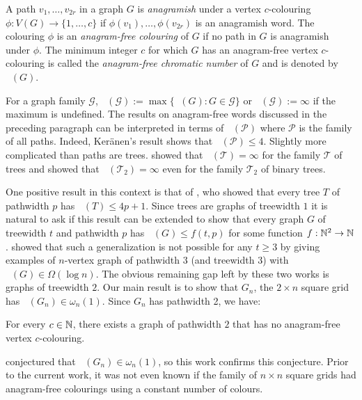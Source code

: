 \documentclass{patmorin}
\DeclareMathOperator{\afcn}{\dot{\chi}_\pi}
\begin{document}
A path $v_1,\ldots,v_{2r}$ in a graph $G$ is \emph{anagramish} under a vertex $c$-colouring $\phi:V(G)\to\{1,\ldots,c\}$ if $\phi(v_1),\ldots,\phi(v_{2r})$ is an anagramish word.  The colouring $\phi$ is an \emph{anagram-free colouring} of $G$ if no path in $G$ is anagramish under $\phi$.  The minimum integer $c$ for which $G$ has an anagram-free vertex $c$-colouring is called the \emph{anagram-free chromatic number} of $G$ and is denoted by $\afcn(G)$.

For a graph family $\mathcal{G}$, $\afcn(\mathcal{G}):=\max\{\afcn(G):G\in\mathcal{G}\}$ or $\afcn(\mathcal{G}):=\infty$ if the maximum is undefined. The results on anagram-free words discussed in the preceding paragraph can be interpreted in terms of $\afcn(\mathcal{P})$ where $\mathcal{P}$ is the family of all paths. Indeed, Ker\"anen's result shows that $\afcn(\mathcal{P})\le 4$. Slightly more complicated than paths are trees.  \citet{wilson.wood:anagram-free} showed that $\afcn(\mathcal{T})=\infty$ for the family $\mathcal{T}$ of trees and \citet{kamcev.luczak.ea:anagram-free} showed that $\afcn(\mathcal{T}_2)=\infty$ even for the family $\mathcal{T}_2$ of binary trees.

One positive result in this context is that of
\citet{wilson.wood:anagram-free}, who showed that every tree $T$ of pathwidth $p$ has $\afcn(T)\le 4p+1$. Since trees are graphs of treewidth $1$ it is natural to ask if this result can be extended to show that every graph $G$ of treewidth $t$ and pathwidth $p$ has $\afcn(G)\le f(t,p)$ for some function $f:\mathbb{N}^2\to\mathbb{N}$.  \citet{carmi.dujmovic.ea:anagram-free} showed that such a generalization is not possible for any $t\ge 3$ by giving examples of $n$-vertex graph of pathwidth $3$ (and treewidth $3$) with $\afcn(G)\in\Omega(\log n)$.  The obvious remaining gap left by these two works is graphs of treewidth $2$. Our main result is to show that $G_n$, the $2\times n$ square grid has $\afcn(G_n)\in\omega_n(1)$. Since $G_n$ has pathwidth 2, we have:

\begin{thm}\label{main_vertex}
    For every $c\in\mathbb{N}$, there exists a graph of pathwidth $2$ that has no anagram-free vertex $c$-colouring.
\end{thm}

\citet[Section 7.1]{wilson:anagram-free} conjectured that $\afcn(G_n)\in\omega_n(1)$, so this work confirms this conjecture.  Prior to the current work, it was not even known if the family of $n\times n$ square grids had anagram-free colourings using a constant number of colours.
\end{document}
